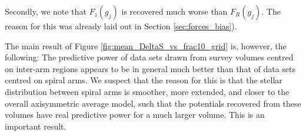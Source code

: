 \documentclass[iop,revtex4,numberedappendix,appendixfloats]{emulateapj}
\newcommand{\hiddenComment}[1]{}
\begin{document}
Secondly, we note that $F_z(g_j)$ is recovered much worse than $F_R(g_j)$. The reason for this was already laid out in Section \ref{sec:forces_bias}). 

The main result of Figure \ref{fig:mean_DeltaS_vs_frac10_grid} is, however, the following: The predictive power of data sets drawn from survey volumes centred on inter-arm regions appears to be in general much better than that of data sets centred on spiral arms. We suspect that the reason for this is that the stellar distribution between spiral arms is smoother, more extended, and closer to the overall axisymmetric average model, such that the potentials recovered from these volumes have real predictive power for a much larger volume. This is an important result.

\hiddenComment{[TO DO: HW writes about the above discussion: "We should discuss this. I am still not 100\% sure I get the point. Is the fact that we predic the potential far away from most stars correctly a consequence of having used a clever functional form.." Jo writes: "Probably comes from the fact that the N-body model was setup with a simple model for the Milky Way. But I think we can just not discuss this in the current paper."]}
\end{document}

